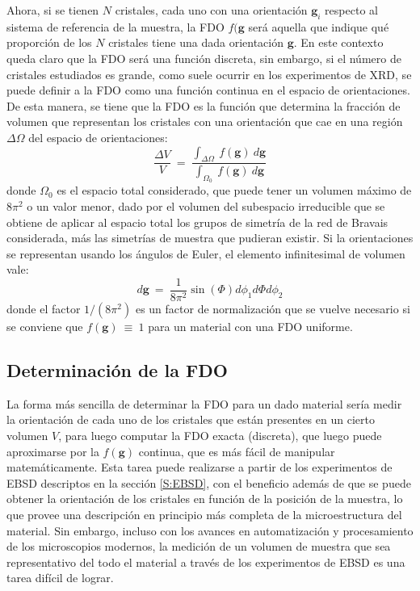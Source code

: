 Ahora, si se tienen $N$ cristales, cada uno con una orientación $\mathbf{g}_i$ respecto al sistema de referencia de la muestra, la FDO $f(\mathbf{g}$ será aquella que indique qué proporción de los $N$ cristales tiene una dada orientación $\mathbf{g}$.
En este contexto queda claro que la FDO será una función discreta, sin embargo, si el número de cristales estudiados es grande, como suele ocurrir en los experimentos de XRD, se puede definir a la FDO como una función continua en el espacio de orientaciones.
De esta manera, se tiene que la FDO es la función que determina la fracción de volumen que representan los cristales con una orientación que cae en una región $\Delta \Omega$ del espacio de orientaciones\cite{kocks2000texture}:
\begin{equation}
  \frac{\Delta V}{V} \ = \ \frac{\int_{\Delta \Omega} \ f(\mathbf{g}) \ d\mathbf{g}}{\int_{\Omega_0} \ f(\mathbf{g})\ d\mathbf{g}}
  \label{eq:ODF}
\end{equation}
\noindent
donde $\Omega_0$ es el espacio total considerado, que puede tener un volumen máximo de $8\pi^2$ o un valor menor, dado por el volumen del subespacio irreducible que se obtiene de aplicar al espacio total los grupos de simetría de la red de Bravais considerada, más las simetrías de muestra que pudieran existir.
Si la orientaciones se representan usando los ángulos de Euler, el elemento infinitesimal de volumen vale:
\begin{equation}
  d\mathbf{g} \ = \ \frac{1}{8\pi^2} \sin(\Phi) d\phi_1 d\Phi d\phi_2
  \label{eq:dg}
\end{equation}
\noindent
donde el factor $1/(8\pi^2)$ es un factor de normalización que se vuelve necesario si se conviene que $f(\mathbf{g}) \ \equiv \ 1$ para un material con una FDO uniforme.

\subsection{Determinación de la FDO}\label{SS:FDO}
La forma más sencilla de determinar la FDO para un dado material sería medir la orientación de cada uno de los cristales que están presentes en un cierto volumen $V$, para luego computar la FDO exacta (discreta), que luego puede aproximarse por la $f(\mathbf{g})$ continua, que es más fácil de manipular matemáticamente.
Esta tarea puede realizarse a partir de los experimentos de EBSD descriptos en la sección \ref{S:EBSD}, con el beneficio además de que se puede obtener la orientación de los cristales en función de la posición de la muestra, lo que provee una descripción en principio más completa de la microestructura del material.
Sin embargo, incluso con los avances en automatización y procesamiento de los microscopios modernos, la medición de un volumen de muestra que sea representativo del todo el material a través de los experimentos de EBSD es una tarea difícil de lograr.

